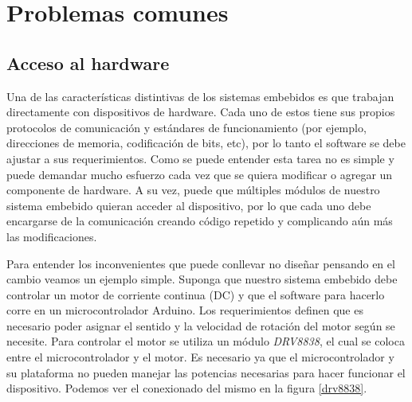 
%
%

\chapter{Problemas comunes}

\section{Acceso al hardware}
\label{Accesoalhardware}
Una de las características distintivas de los sistemas embebidos es que trabajan directamente con dispositivos de hardware. Cada uno de estos tiene sus propios protocolos de comunicación y estándares de funcionamiento (por ejemplo, direcciones de memoria, codificación de bits, etc), por lo tanto el software se debe ajustar a sus requerimientos. Como se puede entender esta tarea no es simple y puede demandar mucho esfuerzo cada vez que se quiera modificar o agregar un componente de hardware. A su vez, puede que múltiples módulos de nuestro sistema embebido quieran acceder al dispositivo, por lo que cada uno debe encargarse de la comunicación creando código repetido y complicando aún más las modificaciones. 

Para entender los inconvenientes que puede conllevar no diseñar pensando en el cambio veamos un ejemplo simple. Suponga que nuestro sistema embebido debe controlar un motor de corriente continua (DC) y que el software para hacerlo corre en un microcontrolador Arduino. Los requerimientos definen que es necesario poder asignar el sentido y la velocidad de rotación del motor según se necesite. Para controlar el motor se utiliza un módulo \textit{DRV8838}, el cual se coloca entre el microcontrolador y el motor. Es necesario ya que el microcontrolador y su plataforma no pueden manejar las potencias necesarias para hacer funcionar el dispositivo. Podemos ver el conexionado del mismo en la figura \ref{drv8838}.

